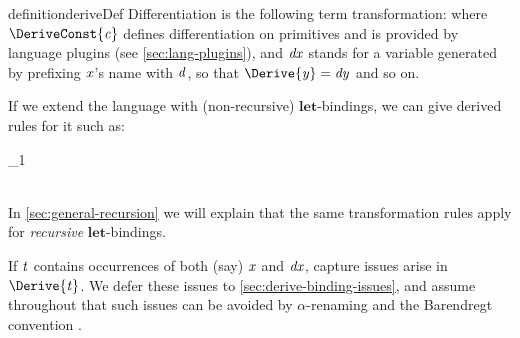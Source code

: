 \begin{restatable}[Differentiation]{definition}{deriveDef}
  \label{def:derive}
Differentiation is the following term transformation:
\deriveDefCore
where \ensuremath{\DeriveConst{\Varid{c}}} defines differentiation on primitives and
is provided by language plugins (see \cref{sec:lang-plugins}),
and \ensuremath{\Varid{dx}} stands for a variable generated by prefixing \ensuremath{\Varid{x}}'s
name with \ensuremath{\Varid{d}}, so that \ensuremath{\Derive{\Varid{y}}\mathrel{=}\Varid{dy}} and so on.%
\end{restatable}
If we extend the language with (non-recursive) \ensuremath{\mathbf{let}}-bindings, we can give
derived rules for it such as:
\begin{hscode}\SaveRestoreHook
{}%
%
%
%
%
%
%
\>[B]{}\<[29]%
\>[29]{}\mathrel{=}{}\<[29E]%
\>[32]{}\;{}\<[38]%
\>[38]{}\<[42]%
\>[42]{}\mathrel{=}_{1}{}\<[E]%
\\
\>[38]{}\<[42]%
\>[42]{}\mathrel{=}\<[E]%
\\
\>[32]{}\;{}\<[38]%
\>[38]{}\<[E]%
\ColumnHook
\end{hscode}\resethooks
In \cref{sec:general-recursion} we will explain that the same transformation
rules apply for \emph{recursive} \ensuremath{\mathbf{let}}-bindings.

If \ensuremath{\Varid{t}} contains occurrences of both (say) \ensuremath{\Varid{x}} and \ensuremath{\Varid{dx}}, capture issues arise in
\ensuremath{\Derive{\Varid{t}}}. We defer these issues to \cref{sec:derive-binding-issues}, and
assume throughout that such issues can be avoided by $\alpha$-renaming and the
Barendregt convention \citep{Barendregt1984lambda}.

